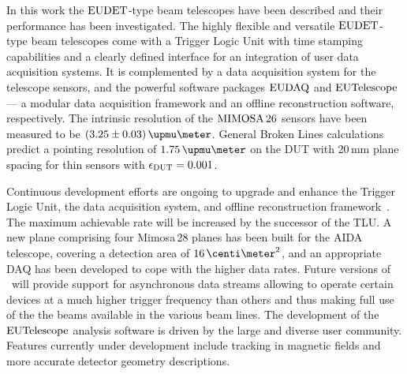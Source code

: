 

In this work the $\textrm{EUDET}$-type beam telescopes have been described and their performance has been investigated. 
The highly flexible and versatile $\textrm{EUDET}$-type beam telescopes come with a Trigger Logic Unit with time stamping capabilities and a clearly defined interface for an integration of user data acquisition systems.
It is complemented by a data acquisition system for the telescope sensors, and the powerful software packages $\textrm{EUDAQ}$ and $\textrm{EUTelescope}$
 ---  a modular data acquisition framework and an offline reconstruction software, respectively. 
The intrinsic resolution of the $\textrm{MIMOSA\,26}$ sensors have been measured to be $(3.25 \pm 0.03)\,\upmu\meter$.
General Broken Lines calculations predict a pointing resolution of $1.75\,\upmu\meter$ on the DUT with 20\,mm plane spacing for thin sensors with $\mathnormal{\epsilon_{\textrm{DUT}}} = 0.001$.

Continuous development efforts are ongoing to upgrade and enhance the Trigger Logic Unit, the data acquisition system, and offline reconstruction framework~\cite{ref:tipp2014_eudaq}.  
The maximum achievable rate will be increased by the successor of the TLU. 
A new plane comprising four Mimosa\,28 planes has been built for the AIDA telescope, covering a detection area of $16\,\centi\meter^2$, and an appropriate DAQ has been developed to cope with the higher data rates. 
Future versions of \eudaq\ will provide support for asynchronous data streams allowing to operate certain devices at a much higher trigger frequency than others
 and thus making full use of the the beams available in the various beam lines.
The development of the $\textrm{EUTelescope}$ analysis software is driven by the large and diverse user community. 
Features currently under development include tracking in magnetic fields and more accurate detector geometry descriptions. 
